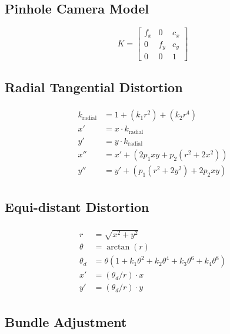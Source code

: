 \documentclass{article}
\begin{document}
\subsection{Pinhole Camera Model}

\begin{equation}
  K =
  \begin{bmatrix}
    f_x & 0 & c_x \\
    0 & f_y & c_y \\
    0 & 0 & 1
  \end{bmatrix}
\end{equation}



\subsection{Radial Tangential Distortion}

\begin{align}
\begin{split}
  k_{\text{radial}} &= 1 + (k_1 r^2) + (k_2 r^4) \\
  x' &= x \cdot k_{\text{radial}} \\
  y' &= y \cdot k_{\text{radial}} \\
  x'' &= x' + (2 p_1 x y + p_2 (r^2 + 2 x^2)) \\
  y'' &= y' + (p_1 (r^2 + 2 y^2) + 2 p_2 x y)
\end{split}
\end{align}



\subsection{Equi-distant Distortion}

\begin{align}
\begin{split}
  r &= \sqrt{x^{2} + y^{2}} \\
  \theta &= \arctan{(r)} \\
  \theta_d &= \theta (1 + k_1 \theta^2 + k_2 \theta^4 + k_3 \theta^6 + k_4 \theta^8) \\
  x' &= (\theta_d / r) \cdot x \\
  y' &= (\theta_d / r) \cdot y
\end{split}
\end{align}



\subsection{Bundle Adjustment}
\end{document}
